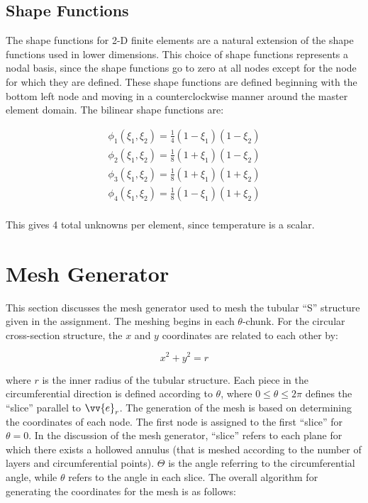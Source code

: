 \documentclass[10pt]{article}
\begin{document}
\subsection{Shape Functions}

The shape functions for 2-D finite elements are a natural extension of the shape functions used in lower dimensions. This choice of shape functions represents a nodal basis, since the shape functions go to zero at all nodes except for the node for which they are defined. These shape functions are defined beginning with the bottom left node and moving in a counterclockwise manner around the master element domain. The bilinear shape functions are:

\begin{equation}
\label{eq:Bricks}
\begin{aligned}
\phi_1(\xi_1,\xi_2)=\frac{1}{4}(1-\xi_1)(1-\xi_2)\\
\phi_2(\xi_1,\xi_2)=\frac{1}{8}(1+\xi_1)(1-\xi_2)\\
\phi_3(\xi_1,\xi_2)=\frac{1}{8}(1+\xi_1)(1+\xi_2)\\
\phi_4(\xi_1,\xi_2)=\frac{1}{8}(1-\xi_1)(1+\xi_2)\\
\end{aligned}
\end{equation}

This gives 4 total unknowns per element, since temperature is a scalar.

\section{Mesh Generator}

This section discusses the mesh generator used to mesh the tubular ``S'' structure given in the assignment. The meshing begins in each \(\theta\)-chunk. For the circular cross-section structure, the \(x\) and \(y\) coordinates are related to each other by:

\begin{equation}
\label{eq:xy}
x^2+y^2=r
\end{equation}

where \(r\) is the inner radius of the tubular structure. Each piece in the circumferential direction is defined according to \(\theta\), where \(0\leq\theta\leq2\pi\) defines the ``slice'' parallel to \(\vv{e}_r\). The generation of the mesh is based on determining the coordinates of each node. The first node is assigned to the first ``slice'' for \(\theta=0\). In the discussion of the mesh generator, ``slice'' refers to each plane for which there exists a hollowed annulus (that is meshed according to the number of layers and circumferential points). \(\Theta\) is the angle referring to the circumferential angle, while \(\theta\) refers to the angle in each slice. The overall algorithm for generating the coordinates for the mesh is as follows:
\end{document}
